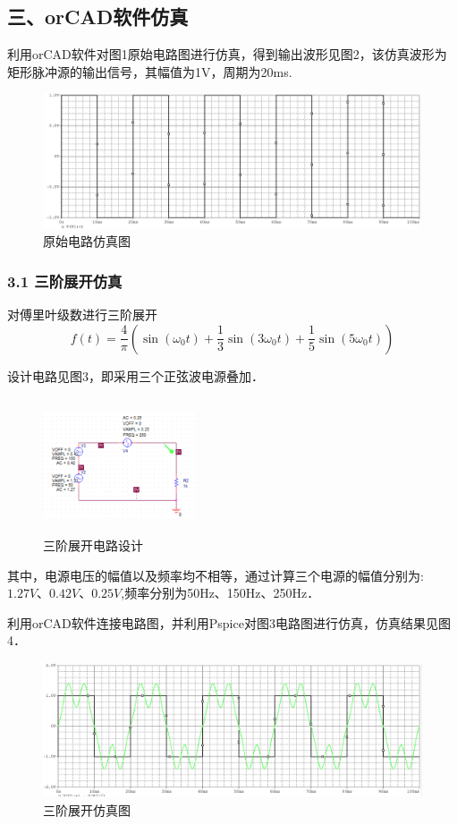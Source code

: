 \documentclass[]{article}
\begin{document}
\subsection*{三、orCAD软件仿真}
利用orCAD软件对图1原始电路图进行仿真，得到输出波形见图2，该仿真波形为矩形脉冲源的输出信号，其幅值为1V，周期为20ms.
\begin{figure}[htbp]
	\centering
	\includegraphics[height=4.0cm,width=12cm]{pics/01.png}%
	\caption{原始电路仿真图}
\end{figure}

\subsubsection*{3.1 三阶展开仿真}
对傅里叶级数进行三阶展开
$$f(t)=\frac{4}{\pi}{(\sin{(\omega_0t)}+\frac{1}{3}\sin{(3\omega_0t)}+\frac{1}{5}\sin{(5\omega_0t)})}$$

设计电路见图3，即采用三个正弦波电源叠加．
\begin{figure}[htbp]
	\centering
	\includegraphics[height=4.0cm,width=4.5cm]{pics/3.png}%
	\caption{三阶展开电路设计}
\end{figure}
其中，电源电压的幅值以及频率均不相等，通过计算三个电源的幅值分别为:$1.27V、0.42V、0.25V$,频率分别为50Hz、150Hz、250Hz．

利用orCAD软件连接电路图，并利用Pspice对图3电路图进行仿真，仿真结果见图4．
\begin{figure}[htbp]
	\centering
	\includegraphics[height=4.0cm,width=12cm]{pics/3fangzhen.png}%
	\caption{三阶展开仿真图}
\end{figure}
\end{document}
